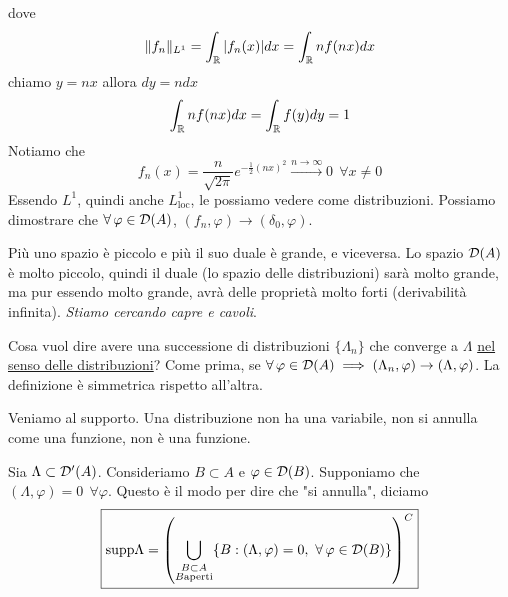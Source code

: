 dove
\begin{equation*}
\Vert f_{n} \Vert_{L^{1}} = \int_{\mathbb{R}}| f_{n}(x)| dx = \int_{\mathbb{R}} nf(nx) dx
\end{equation*}
chiamo $y = nx$ allora $dy = ndx$
\begin{equation*}
\int_{\mathbb{R}} nf(nx) dx = \int_{\mathbb{R}} f(y) dy = 1
\end{equation*}
Notiamo che
\begin{equation*}
f_{n}(x) = \frac{n}{\sqrt{2\pi}} e^{- \frac{1}{2}(nx)^{2}}\xrightarrow{n\rightarrow \infty} 0\ \ \forall x\neq 0
\end{equation*}
Essendo $L^{1}$, quindi anche $L^{1}_{\mathrm{loc}}$, le possiamo vedere come distribuzioni. Possiamo dimostrare che $\forall \varphi \in \Dc(A)$, $(f_{n}, \varphi)\rightarrow (\delta_{0}, \varphi)$.

Più uno spazio è piccolo e più il suo duale è grande, e viceversa. Lo spazio $\mathcal{D}(A)$ è molto piccolo, quindi il duale (lo spazio delle distribuzioni) sarà molto grande, ma pur essendo molto grande, avrà delle proprietà molto forti (derivabilità infinita). \textit{Stiamo cercando capre e cavoli}.

\begin{defn}
Cosa vuol dire avere una successione di distribuzioni $\{\Lambda_{n}\}$ che converge a $\Lambda $ \underline{nel senso delle distribuzioni}? Come prima, se $\forall \varphi \in \Dc(A) \implies (\Lambda_{n}, \varphi)\rightarrow (\Lambda, \varphi)$. La definizione è simmetrica rispetto all'altra.
\end{defn}
Veniamo al supporto. Una distribuzione non ha una variabile, non si annulla come una funzione, non è una funzione.
\begin{defn}
Sia $\Lambda \subset \mathcal{D}'(A)$. Consideriamo $B\subset A$ e $\varphi \in \mathcal{D}(B)$. Supponiamo che $(\Lambda, \varphi) = 0\ \ \forall \varphi $. Questo è il modo per dire che "si annulla", diciamo
\begin{equation*}
\boxed{
\mathrm{supp} \Lambda =
\left(\bigcup_{\substack{B\subset A\\B\text{aperti}}} \{B: (\Lambda, \varphi) = 0, \ \forall \varphi \in \Dc(B)\}\right)^{C}
}
\end{equation*}
\end{defn}

